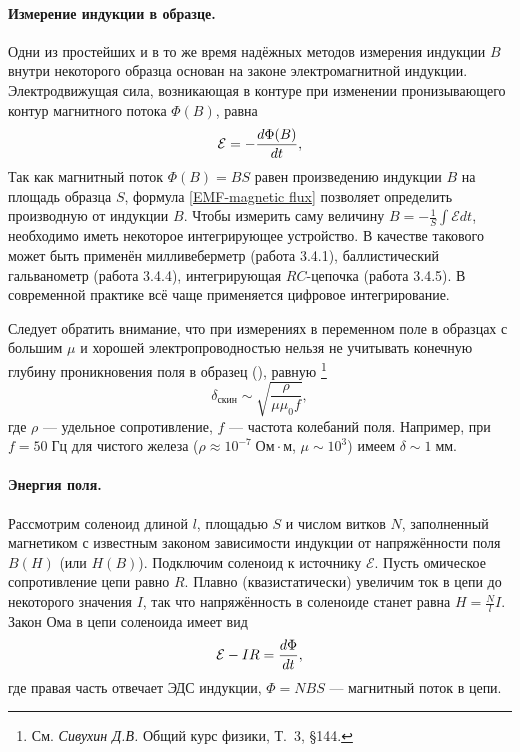

\paragraph{Измерение индукции в образце.}
Одни из простейших и в то же время надёжных методов измерения
индукции $B$ внутри некоторого образца основан
на законе электромагнитной индукции.
Электродвижущая сила, возникающая в контуре при изменении
пронизывающего контур магнитного потока $\Phi(B)$, равна
\begin{equation}
	\eqmark{EMF-magnetic flux}
	\mathcal{E} = - \frac{d\Phi (B)}{dt},
\end{equation}
Так как магнитный поток $\Phi (B)=BS$ равен произведению индукции $B$ на площадь
образца $S$, формула \eqref{EMF-magnetic flux} позволяет определить производную от
индукции $B$. Чтобы измерить саму величину $B=-\frac1{S}\int \mathcal{E} dt$,
необходимо иметь некоторое интегрирующее устройство.
В качестве такового может быть применён милливеберметр (работа 3.4.1),
баллистический гальванометр (работа 3.4.4), интегрирующая $RC$-цепочка
(работа 3.4.5). В современной практике всё чаще применяется цифровое интегрирование.

Следует обратить внимание, что при измерениях в переменном поле
в образцах с большим $\mu$ и хорошей электропроводностью
нельзя не учитывать конечную глубину
проникновения поля в образец (), равную%
\footnote{См. \textit{Сивухин Д.В.} Общий курс физики, Т.~3, \S 144.}
\begin{equation*}
\delta_{скин} \sim \sqrt{\frac{\rho}{\mu \mu_0 f}},
\end{equation*}
где $\rho$ --- удельное сопротивление, $f$ --- частота колебаний поля.
Например, при $f=50\;Гц$ для чистого железа ($\rho \approx 10^{-7}\;Ом\cdot м$,
$\mu \sim 10^3$) имеем $\delta \sim 1\;мм$.


\label{sec:forces}

\paragraph{Энергия поля.}
Рассмотрим соленоид длиной $l$, площадью $S$ и числом витков $N$,
заполненный магнетиком с известным законом зависимости индукции от напряжённости
поля $B(H)$ (или $H(B)$). Подключим соленоид к источнику $\mathcal{E}$.
Пусть омическое сопротивление цепи равно $R$.
Плавно (квазистатически) увеличим ток в цепи до некоторого значения
$I$, так что напряжённость в соленоиде станет равна
$H = \frac{N}{l} I$. Закон Ома в цепи соленоида имеет вид
\begin{equation}
    \eqmark{OhmLaw-solenoid}
\mathcal{E} - IR = \frac{d\Phi}{dt},
\end{equation}
где правая часть отвечает ЭДС индукции, $\Phi = NBS$ --- магнитный поток в
цепи.

